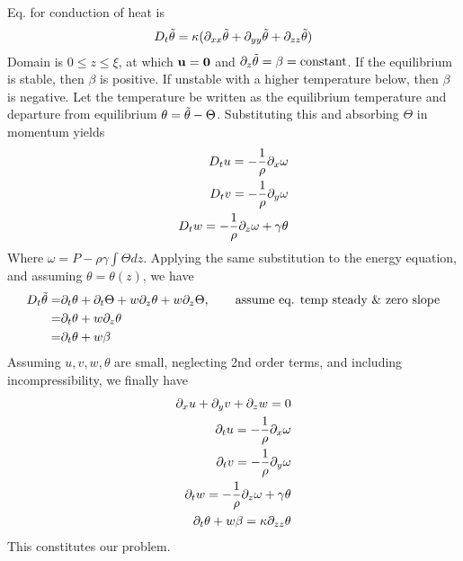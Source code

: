 \documentclass[11pt]{article}
\begin{document}
Eq. for conduction of heat is
\begin{equation}\begin{aligned}
D_t \tilde{\theta} = \kappa (\partial_{xx} \tilde{\theta}+\partial_{yy} \tilde{\theta}+\partial_{zz} \tilde{\theta}) \\
\end{aligned} \end{equation}
Domain is $0 \le z \le \xi$, at which $\mathbf{u}=\mathbf{0}$ and $\partial_z \tilde{\theta} = \beta = \text{constant}$. If the equilibrium is stable, then $\beta$ is positive. If unstable with a higher temperature below, then $\beta$ is negative.
Let the temperature be written as the equilibrium temperature and departure from equilibrium $\theta = \tilde{\theta} - \Theta$. Substituting this and absorbing $\Theta$ in momentum yields
\begin{equation}\begin{aligned}
D_t u = -\frac{1}{\rho} \partial_x \omega     \\
D_t v = -\frac{1}{\rho} \partial_y \omega     \\
D_t w = -\frac{1}{\rho} \partial_z \omega + \gamma \theta \\
\end{aligned} \end{equation}
Where $\omega = P - \rho \gamma \int \Theta dz$.
Applying the same substitution to the energy equation, and assuming $\theta = \theta(z)$, we have
\begin{equation}\begin{aligned}
D_t \tilde{\theta} = & \partial_t \theta + \partial_t \Theta + w \partial_z \theta + w \partial_z \Theta, \qquad \text{assume eq. temp steady \& zero slope} \\
            = & \partial_t \theta + w \partial_z \theta  \\
            = & \partial_t \theta + w \beta  \\
\end{aligned} \end{equation}
Assuming $u,v,w,\theta$ are small, neglecting 2nd order terms, and including incompressibility, we finally have
\begin{equation}\begin{aligned}
\partial_x u + \partial_y v + \partial_z w = 0 \\
\partial_t u = -\frac{1}{\rho} \partial_x \omega     \\
\partial_t v = -\frac{1}{\rho} \partial_y \omega     \\
\partial_t w = -\frac{1}{\rho} \partial_z \omega + \gamma \theta \\
\partial_t \theta + w \beta = \kappa \partial_{zz} \theta \\
\end{aligned} \end{equation}
This constitutes our problem.
\end{document}
